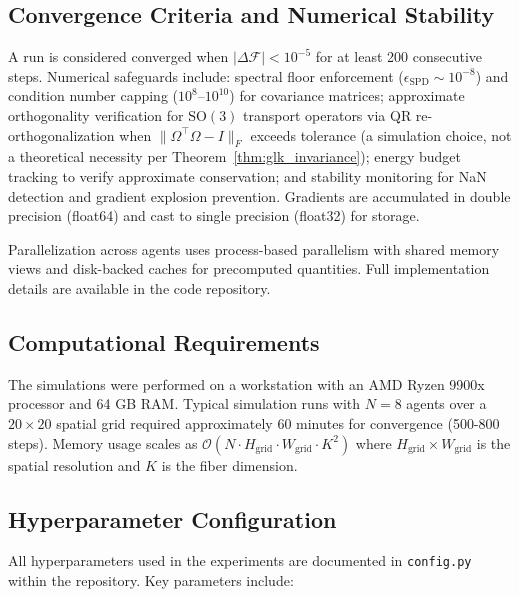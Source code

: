 \documentclass[twoside,11pt]{article}
\begin{document}
\subsection{Convergence Criteria and Numerical Stability}
A run is considered converged when $|\Delta \mathcal{F}| < 10^{-5}$ for at least 200 consecutive steps. Numerical safeguards include: spectral floor enforcement ($\epsilon_{\mathrm{SPD}} \sim 10^{-8}$) and condition number capping ($10^8$--$10^{10}$) for covariance matrices; approximate orthogonality verification for $\mathrm{SO}(3)$ transport operators via QR re-orthogonalization when $\|\Omega^\top\Omega - I\|_F$ exceeds tolerance (a simulation choice, not a theoretical necessity per Theorem~\ref{thm:glk_invariance}); energy budget tracking to verify approximate conservation; and stability monitoring for NaN detection and gradient explosion prevention. Gradients are accumulated in double precision (float64) and cast to single precision (float32) for storage.

Parallelization across agents uses process-based parallelism with shared memory views and disk-backed caches for precomputed quantities. Full implementation details are available in the code repository.

\subsection{Computational Requirements}
The simulations were performed on a workstation with an AMD Ryzen 9900x processor and 64 GB RAM. Typical simulation runs with $N=8$ agents over a $20 \times 20$ spatial grid required approximately 60 minutes for convergence (500-800 steps). Memory usage scales as $\mathcal{O}(N \cdot H_{\text{grid}} \cdot W_{\text{grid}} \cdot K^2)$ where $H_{\text{grid}} \times W_{\text{grid}}$ is the spatial resolution and $K$ is the fiber dimension.

\subsection{Hyperparameter Configuration}
All hyperparameters used in the experiments are documented in \texttt{config.py} within the repository. Key parameters include:
\end{document}
